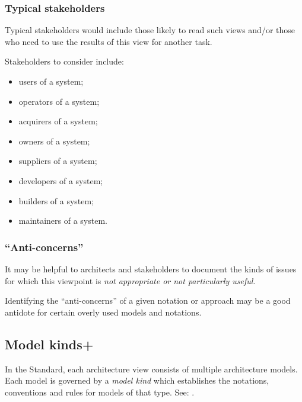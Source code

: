 
\subsubsection{Typical stakeholders} 


Typical stakeholders would include those likely to read such views
and/or those who need to use the results of this view for another
task.

Stakeholders to consider include:
\begin{itemize}
\item users of a system; 
\item operators of a system; 
\item acquirers of a system;
\item owners of a system; 
\item suppliers of a system; 
\item developers of a system; 
\item builders of a system; 
\item maintainers of a system.
\end{itemize}

\subsubsection{``Anti-concerns'' \Optional} 

It may be helpful to architects and stakeholders to
document the kinds of issues for which this viewpoint is \emph{not
  appropriate or not particularly useful}.

Identifying the ``anti-concerns'' of a given notation or approach may
be a good antidote for certain overly used models and notations.




\subsection{Model kinds+}\label{mk:list}


In the Standard, each architecture view consists of multiple
architecture models. Each model is governed by a \textit{model kind}
which establishes the notations, conventions and rules for models of
that type.  See: .


